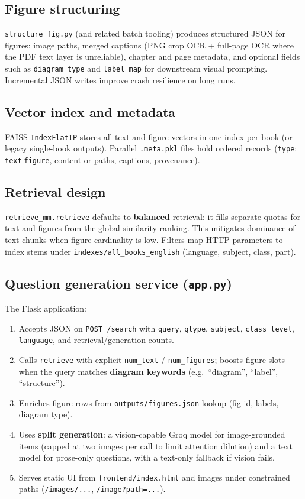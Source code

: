 \documentclass[11pt]{article}
\begin{document}
\subsection{Figure structuring}

\texttt{structure\_fig.py} (and related batch tooling) produces structured JSON for figures: image paths, merged captions (PNG crop OCR + full-page OCR where the PDF text layer is unreliable), chapter and page metadata, and optional fields such as \texttt{diagram\_type} and \texttt{label\_map} for downstream visual prompting. Incremental JSON writes improve crash resilience on long runs.

\subsection{Vector index and metadata}

FAISS \texttt{IndexFlatIP} stores all text and figure vectors in one index per book (or legacy single-book outputs). Parallel \texttt{.meta.pkl} files hold ordered records (\texttt{type}: \texttt{text}|\texttt{figure}, content or paths, captions, provenance).

\subsection{Retrieval design}

\texttt{retrieve\_mm.retrieve} defaults to \textbf{balanced} retrieval: it fills separate quotas for text and figures from the global similarity ranking. This mitigates dominance of text chunks when figure cardinality is low. Filters map HTTP parameters to index stems under \texttt{indexes/all\_books\_english} (language, subject, class, part).

\subsection{Question generation service (\texttt{app.py})}

The Flask application:

\begin{enumerate}
  \item Accepts JSON on \texttt{POST /search} with \texttt{query}, \texttt{qtype}, \texttt{subject}, \texttt{class\_level}, \texttt{language}, and retrieval/generation counts.
  \item Calls \texttt{retrieve} with explicit \texttt{num\_text} / \texttt{num\_figures}; boosts figure slots when the query matches \textbf{diagram keywords} (e.g.\ ``diagram'', ``label'', ``structure'').
  \item Enriches figure rows from \texttt{outputs/figures.json} lookup (fig id, labels, diagram type).
  \item Uses \textbf{split generation}: a vision-capable Groq model for image-grounded items (capped at two images per call to limit attention dilution) and a text model for prose-only questions, with a text-only fallback if vision fails.
  \item Serves static UI from \texttt{frontend/index.html} and images under constrained paths (\texttt{/images/...}, \texttt{/image?path=...}).
\end{enumerate}
\end{document}
